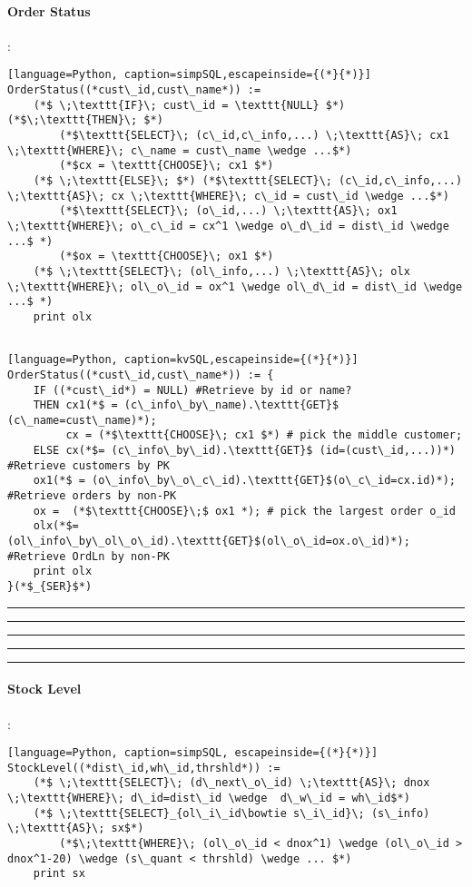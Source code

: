 \paragraph{Order Status}:
\begin{lstlisting}[language=Python, caption=simpSQL,escapeinside={(*}{*)}]
OrderStatus((*cust\_id,cust\_name*)) := 
	(*$ \;\texttt{IF}\; cust\_id = \texttt{NULL} $*) (*$\;\texttt{THEN}\; $*) 
		(*$\texttt{SELECT}\; (c\_id,c\_info,...) \;\texttt{AS}\; cx1 \;\texttt{WHERE}\; c\_name = cust\_name \wedge ...$*)
		(*$cx = \texttt{CHOOSE}\; cx1 $*) 
	(*$ \;\texttt{ELSE}\; $*) (*$\texttt{SELECT}\; (c\_id,c\_info,...) \;\texttt{AS}\; cx \;\texttt{WHERE}\; c\_id = cust\_id \wedge ...$*)
		(*$\texttt{SELECT}\; (o\_id,...) \;\texttt{AS}\; ox1 \;\texttt{WHERE}\; o\_c\_id = cx^1 \wedge o\_d\_id = dist\_id \wedge ...$ *)
		(*$ox = \texttt{CHOOSE}\; ox1 $*) 
	(*$ \;\texttt{SELECT}\; (ol\_info,...) \;\texttt{AS}\; olx \;\texttt{WHERE}\; ol\_o\_id = ox^1 \wedge ol\_d\_id = dist\_id \wedge ...$ *)
	print olx  
	
\end{lstlisting}

\lstset{style=kvSQLstyle}
\begin{lstlisting}[language=Python, caption=kvSQL,escapeinside={(*}{*)}]
OrderStatus((*cust\_id,cust\_name*)) := {
	IF ((*cust\_id*) = NULL) #Retrieve by id or name?
	THEN cx1(*$ = (c\_info\_by\_name).\texttt{GET}$ (c\_name=cust\_name)*);
	     cx = (*$\texttt{CHOOSE}\; cx1 $*) # pick the middle customer;
	ELSE cx(*$= (c\_info\_by\_id).\texttt{GET}$ (id=(cust\_id,...))*) #Retrieve customers by PK
	ox1(*$ = (o\_info\_by\_o\_c\_id).\texttt{GET}$(o\_c\_id=cx.id)*); #Retrieve orders by non-PK
	ox =  (*$\texttt{CHOOSE}\;$ ox1 *);	# pick the largest order o_id
	olx(*$=(ol\_info\_by\_ol\_o\_id).\texttt{GET}$(ol\_o\_id=ox.o\_id)*); #Retrieve OrdLn by non-PK
	print olx  
}(*$_{SER}$*)
\end{lstlisting}



\hrule
\hrule
\hrule
\hrule
\hrule

\vspace{10mm}
\lstset{style=simpSQLstyle}
\paragraph{Stock Level}:
\begin{lstlisting}[language=Python, caption=simpSQL, escapeinside={(*}{*)}]
StockLevel((*dist\_id,wh\_id,thrshld*)) := 
	(*$ \;\texttt{SELECT}\; (d\_next\_o\_id) \;\texttt{AS}\; dnox \;\texttt{WHERE}\; d\_id=dist\_id \wedge  d\_w\_id = wh\_id$*)
	(*$ \;\texttt{SELECT}_{ol\_i\_id\bowtie s\_i\_id}\; (s\_info) \;\texttt{AS}\; sx$*)
		(*$\;\texttt{WHERE}\; (ol\_o\_id < dnox^1) \wedge (ol\_o\_id > dnox^1-20) \wedge (s\_quant < thrshld) \wedge ... $*)
	print sx
\end{lstlisting}

